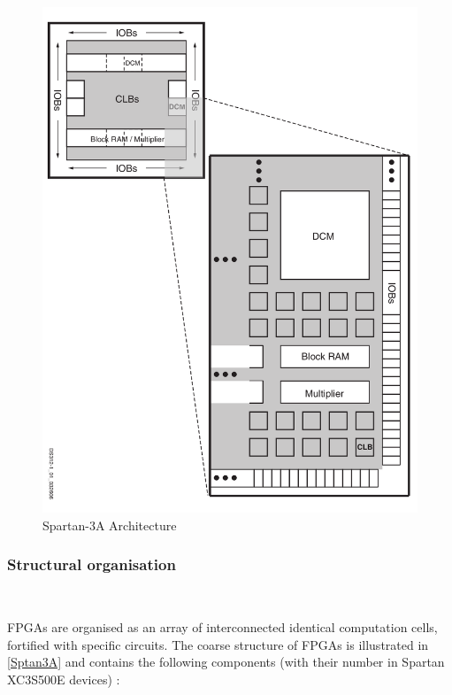 \documentclass[10pt,a4paper]{article}
\renewcommand{\indent}{~\\\vspace{-.8cm}}
\begin{document}
\begin{figure}
	\vspace{-60pt}
	\center
	\includegraphics[scale=0.26]{Spartan.png}
	\caption{Spartan-3A Architecture \cite{Spartan}}
	\label{Sptan3A}
\end{figure}

\subsubsection{Structural organisation}\indent

FPGAs are organised as an array of interconnected identical computation cells, fortified with specific circuits. The coarse structure of FPGAs is illustrated in \autoref{Sptan3A} and contains the following components (with their number in Spartan XC3S500E devices) :
\end{document}
